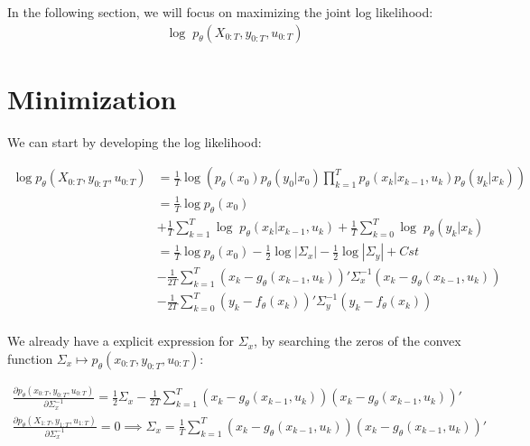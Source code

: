 \documentclass[10pt,a4paper]{report}
\begin{document}
In the following section, we will focus on maximizing the joint log likelihood:
\begin{align}
	\log \; p_{\theta}(X_{0:T}, y_{0:T}, u_{0:T})
	\label{log_likelihood}
\end{align}

\section{Minimization}
We can start by developing the log likelihood:

\begin{align*}
	\log p_{\theta}(X_{0:T}, y_{0:T}, u_{0:T}) & = \frac{1}{T} \log\left(p_\theta(x_0)p_\theta(y_0 | x_0)\prod_{k=1}^{T} p_{\theta}(x_k | x_{k-1}, u_k) p_{\theta}(y_k | x_k)\right) \\
						   & = \frac{1}{T} \log p_\theta(x_0)                                                                                                    \\
						   & + \frac{1}{T} \sum_{k=1}^{T} \log \; p_{\theta}(x_k | x_{k-1}, u_k) + \frac{1}{T} \sum_{k=0}^{T} \log \; p_{\theta}(y_k | x_k)      \\
						   & = \frac{1}{T} \log p_\theta(x_0) -\frac{1}{2} \log|\Sigma_x| -\frac{1}{2} \log|\Sigma_y| + Cst                                      \\
						   & - \frac{1}{2T} \sum_{k=1}^{T}(x_k - g_\theta(x_{k-1}, u_{k}))' \Sigma_x^{-1} (x_k - g_\theta(x_{k-1}, u_{k}))                       \\
						   & - \frac{1}{2T} \sum_{k=0}^{T}(y_k - f_\theta(x_k))' \Sigma_y^{-1} (y_k - f_\theta(x_k))                                             \\
\end{align*}

We already have a explicit expression for $\Sigma_x$, by searching the zeros of the convex function $\Sigma_x \mapsto p_\theta(x_{0:T}, y_{0:T}, u_{0:T})$:

\begin{align*}
	\frac{\partial p_\theta(x_{0:T}, y_{0:T}, u_{0:T})}{\partial \Sigma_x^{-1}} = \frac{1}{2} \Sigma_x - \frac{1}{2T} \sum_{k=1}^T (x_k - g_{\theta}(x_{k-1}, u_k))(x_k - g_{\theta}(x_{k-1}, u_k))' \\
	\frac{\partial p_\theta(X_{1:T}, y_{1:T}, u_{1:T})}{\partial \Sigma_x^{-1}} = 0 \implies \Sigma_x = \frac{1}{T}\sum_{k=1}^T (x_k - g_{\theta}(x_{k-1}, u_k))(x_k - g_{\theta}(x_{k-1}, u_k))'
\end{align*}
\end{document}
